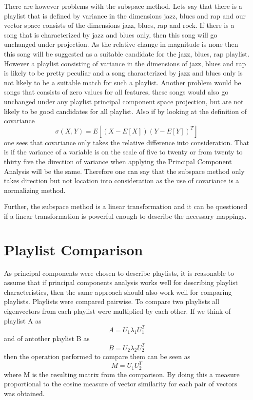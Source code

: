 \documentclass[a4paper,11pt]{kth-mag}
\begin{document}
There are however problems with the subspace method. Lets say that there is a playlist that is defined by variance in the dimensions jazz, blues and rap and our vector space consists of the dimensions jazz, blues, rap and rock. If there is a song that is characterized by jazz and blues only, then this song will go unchanged under projection. As the relative change in magnitude is none then this song will be suggested as a suitable candidate for the jazz, blues, rap playlist. However a playlist consisting of variance in the dimensions of jazz, blues and rap is likely to be pretty peculiar and a song characterized by jazz and blues only is not likely to be a suitable match for such a playlist. Another problem would be songs that consists of zero values for all features, these songs would also go unchanged under any playlist principal component space projection, but are not likely to be good candidates for all playlist. Also if by looking at the definition of covariance 
\begin{equation}
\sigma(X, Y) = E[(X - E[X]) (Y - E[Y])^T]
\end{equation} 
one sees that covariance only takes the relative difference into consideration. That is if the variance of a variable is on the scale of five to twenty or from twenty to thirty five the direction of variance when applying the Principal Component Analysis will be the same. Therefore one can say that the subspace method only takes direction but not location into consideration as the use of covariance is a normalizing method.

Further, the subspace method is a linear transformation and it can be questioned if a linear transformation is powerful enough to describe the necessary mappings.

\section{Playlist Comparison}
As principal components were chosen to describe playlists, it is reasonable to assume that if principal components analysis works well for describing playlist characteristics, then the same approach should also work well for comparing playlists. Playlists were compared pairwise. To compare two playlists all eigenvectors from each playlist were multiplied by each other. If we think of playlist A as  \[A = U_1 \lambda_1 U_1^T\] and of antother playlist B as \[B = U_2 \lambda_2 U_2^T\] then the operation performed to compare them can be seen as \[M = U_1 U_2^T\] where M is the resulting matrix from the comparison. By doing this a measure proportional to the cosine measure of vector similarity for each pair of vectors was obtained. 
\end{document}
